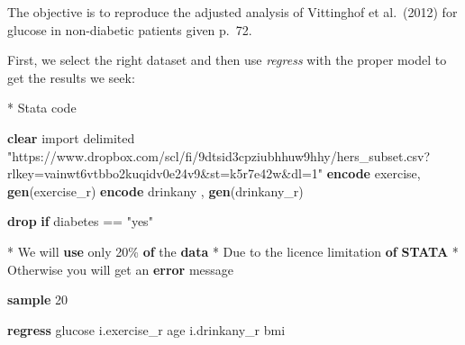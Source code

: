 \documentclass[
  letterpaper,
  DIV=11,
  numbers=noendperiod]{scrreprt}
\newenvironment{Shaded}{\begin{snugshade}}{\end{snugshade}}
\newcommand{\FunctionTok}[1]{\textcolor[rgb]{0.28,0.35,0.67}{#1}}
\newcommand{\KeywordTok}[1]{\textcolor[rgb]{0.00,0.23,0.31}{\textbf{#1}}}
\newcommand{\NormalTok}[1]{\textcolor[rgb]{0.00,0.23,0.31}{#1}}
\newcommand{\StringTok}[1]{\textcolor[rgb]{0.13,0.47,0.30}{#1}}
\begin{document}
The objective is to reproduce the adjusted analysis of Vittinghof et
al.~(2012) for glucose in non-diabetic patients given p.~72.

First, we select the right dataset and then use \emph{regress} with the
proper model to get the results we seek:

\begin{Shaded}
\begin{Highlighting}[]
\NormalTok{* Stata code}

\KeywordTok{clear}
\NormalTok{import delimited }\StringTok{"https://www.dropbox.com/scl/fi/9dtsid3cpziubhhuw9hhy/hers\_subset.csv?rlkey=vainwt6vtbbo2kuqidv0e24v9\&st=k5r7e42w\&dl=1"}
\KeywordTok{encode}\NormalTok{  exercise, }\KeywordTok{gen}\NormalTok{(exercise\_r)}
\KeywordTok{encode}\NormalTok{ drinkany , }\KeywordTok{gen}\NormalTok{(drinkany\_r)}

\KeywordTok{drop} \KeywordTok{if}\NormalTok{ diabetes == }\StringTok{"yes"}

\NormalTok{* We will }\KeywordTok{use}\NormalTok{ only 20\% }\KeywordTok{of}\NormalTok{ the }\KeywordTok{data}
\NormalTok{* Due to the licence limitation }\KeywordTok{of} \KeywordTok{STATA}
\NormalTok{* Otherwise you will }\FunctionTok{get}\NormalTok{ an }\KeywordTok{error}\NormalTok{ message}

\KeywordTok{sample}\NormalTok{ 20}


\KeywordTok{regress}\NormalTok{ glucose i.exercise\_r age i.drinkany\_r bmi }


\end{Highlighting}
\end{Shaded}
\end{document}
